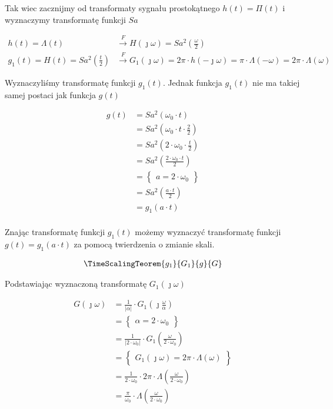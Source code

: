 \begin{task}
Tak wiec zacznijmy od transformaty sygnału prostokątnego $h(t)=\Pi(t)$ i wyznaczymy transformatę funkcji $Sa$

\begin{align*}
h(t)=\Lambda(t) &\overset{F}{\rightarrow} H(\jmath \omega) = Sa^2\left(\frac{\omega}{2}\right)\\
g_1(t) = H(t) = Sa^2\left(\frac{t}{2}\right) &\overset{F}{\rightarrow} 
G_1(\jmath \omega) = 2\pi \cdot h(- \jmath \omega) = \pi \cdot  \Lambda\left(-\omega\right) = 2\pi \cdot  \Lambda\left(\omega\right)
\end{align*}

Wyznaczyliśmy transformatę funkcji $g_1(t)$. Jednak funkcja $g_1(t)$ nie ma takiej samej postaci jak funkcja $g(t)$ 

\begin{align*}
g(t)&=Sa^2\left(\omega_0 \cdot t\right)\\
&=Sa^2\left(\omega_0 \cdot t \cdot \frac{2}{2}\right)\\
&=Sa^2\left(2\cdot \omega_0 \cdot \frac{t}{2}\right)\\
&=Sa^2\left(\frac{2\cdot \omega_0 \cdot t}{2}\right)\\
&=\begin{Bmatrix}
a = 2\cdot \omega_0
\end{Bmatrix}\\
&=Sa^2\left(\frac{a\cdot t}{2}\right)\\
&=g_1(a\cdot t) \\
\end{align*}

Znając transformatę funkcji $g_1(t)$ możemy wyznaczyć transformatę funkcji $g(t)=g_1(a \cdot t)$ za pomocą twierdzenia o zmianie skali.

\begin{align*}
\TimeScalingTeorem{g_1}{G_1}{g}{G}
\end{align*}

Podstawiając wyznaczoną transformatę $G_1(\jmath \omega)$

\begin{align*}
G(\jmath \omega) &= \frac{1}{\left|\alpha \right|} \cdot G_1(\jmath \frac{\omega}{\alpha})\\
&=\begin{Bmatrix}
\alpha = 2\cdot \omega_0
\end{Bmatrix}\\
&=\frac{1}{\left| 2\cdot \omega_0 \right|} \cdot G_1( \frac{\omega}{2\cdot \omega_0})\\
&=\begin{Bmatrix}
G_1(\jmath \omega) = 2\pi \cdot \Lambda\left(\omega\right)
\end{Bmatrix}\\
&=\frac{1}{ 2\cdot \omega_0 } \cdot 2\pi \cdot \Lambda\left( \frac{\omega}{2\cdot \omega_0}\right)\\
&=\frac{\pi}{ \omega_0 } \cdot \Lambda\left( \frac{\omega}{2\cdot \omega_0}\right)\\
\end{align*}


\end{task}
